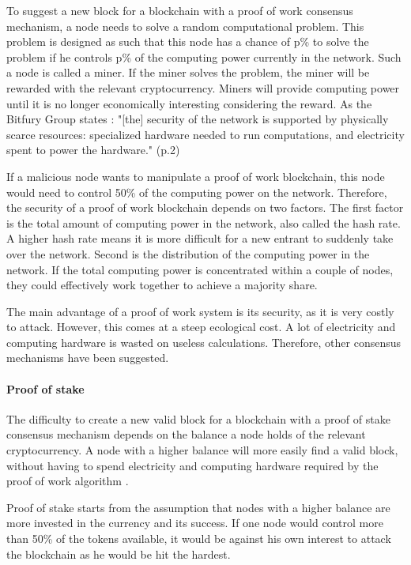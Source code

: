 To suggest a new block for a blockchain with a proof of work consensus mechanism, a node needs to solve a random computational problem. This problem is designed as such that this node has a chance of p\% to solve the problem if he controls p\% of the computing power currently in the network. Such a node is called a miner. If the miner solves the problem, the miner will be rewarded with the relevant cryptocurrency. Miners will provide computing power until it is no longer economically interesting considering the reward. As the Bitfury Group states \cite{bitfury-pos-vs-pow}: "[the] security of the network is supported by physically scarce resources: specialized hardware needed to run computations, and electricity spent to power the hardware." (p.2)

If a malicious node wants to manipulate a proof of work blockchain, this node would need to control 50\% of the computing power on the network. Therefore, the security of a proof of work blockchain depends on two factors. The first factor is the total amount of computing power in the network, also called the hash rate. A higher hash rate means it is more difficult for a new entrant to suddenly take over the network. Second is the distribution of the computing power in the network. If the total computing power  is concentrated within a couple of nodes, they could effectively work together to achieve a majority share.

The main advantage of a proof of work system is its security, as it is very costly to attack. However, this comes at a steep ecological cost. A lot of electricity and computing hardware is wasted on useless calculations. Therefore, other consensus mechanisms have been suggested.

\paragraph{Proof of stake}

The difficulty to create a new valid block for a blockchain with a proof of stake consensus mechanism depends on the balance a node holds of the relevant cryptocurrency. A node with a higher balance will more easily find a valid block, without having to spend electricity and computing hardware required by the proof of work algorithm \cite{bitfury-pos-vs-pow}.

Proof of stake starts from the assumption that nodes with a higher balance are more invested in the currency and its success. If one node would control more than 50\% of the tokens available, it would be against his own interest to attack the blockchain as he would be hit the hardest. 

